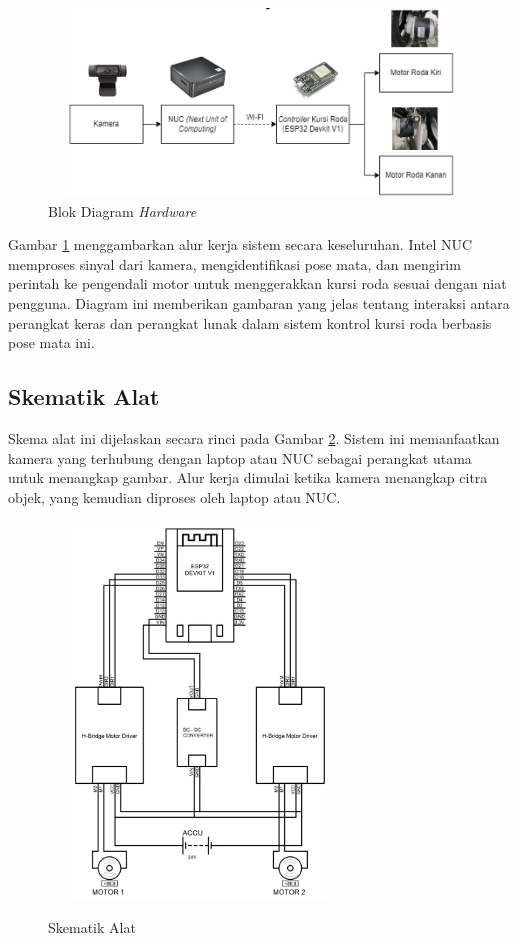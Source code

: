 \begin{figure} [ht] \centering
  \includegraphics[width=13cm, height=5cm]{gambar/bab3/metod2.png}
  \caption{Blok Diagram \textit{Hardware}}
  \label{fig:hardware}
\end{figure}

Gambar \ref{fig:hardware} menggambarkan alur kerja sistem secara keseluruhan. Intel NUC memproses sinyal dari kamera, mengidentifikasi pose mata, dan mengirim perintah ke pengendali motor untuk menggerakkan kursi roda sesuai dengan niat pengguna. Diagram ini memberikan gambaran yang jelas tentang interaksi antara perangkat keras dan perangkat lunak dalam sistem kontrol kursi roda berbasis pose mata ini.

\subsection{Skematik Alat}
\label{sec:skematik}

Skema alat ini dijelaskan secara rinci pada Gambar \ref{fig:Skematik Alat}. Sistem ini memanfaatkan kamera yang terhubung dengan laptop atau NUC sebagai perangkat utama untuk menangkap gambar. Alur kerja dimulai ketika kamera menangkap citra objek, yang kemudian diproses oleh laptop atau NUC. 

\begin{figure} [H] \centering
  \includegraphics[width=8cm, height=10cm]{gambar/bab3/Schematics.png}
  \caption{Skematik Alat}
  \label{fig:Skematik Alat}
  \parencite{ekatama2024perancangan}
\end{figure}

